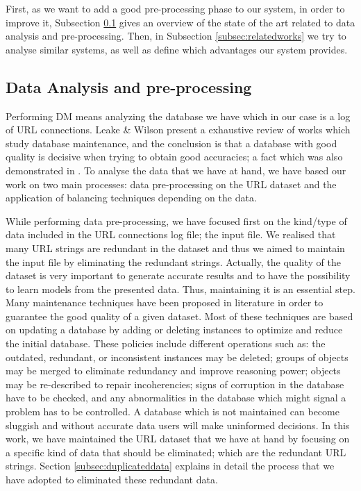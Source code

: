 \documentclass{llncs}
\begin{document}
First, as we want to add a good pre-processing phase to our system, in order to improve it, Subsection \ref{subsec:dataanalysis} gives an overview of the state of the art related to data analysis and pre-processing. Then, in Subsection \ref{subsec:relatedworks} we try to analyse similar systems, as well as define which advantages our system provides.

\subsection{Data Analysis and pre-processing}
\label{subsec:dataanalysis}

Performing DM means analyzing the database we have \cite{Frank2011}
which in our case is a log of URL connections. Leake \& Wilson
\cite{wilson2001maintaining} present a exhaustive review of works which
study database maintenance, and the conclusion is that a database with
good quality is decisive when trying to obtain good accuracies; a fact
which was also demonstrated in \cite{zeineb2014thesis}. To analyse the
data that we have at hand, we have based our work on two main
processes: data pre-processing on
the URL dataset and the application of balancing
techniques depending on the data. %

While performing data pre-processing, we have focused first on the
kind/type of data included in the URL connections log file; the input
file. We realised %
 that many URL strings are redundant in the dataset and thus we aimed
 to maintain the input file by eliminating the redundant
 strings. Actually, the quality of the dataset is very important to
 generate accurate results and to have the possibility to learn models
 from the presented data. Thus, maintaining it is an essential
 step. Many maintenance techniques have been proposed in literature \cite{wilson2001maintaining} in order to guarantee the good quality of a given dataset.   Most of these techniques are based on updating a database by adding or deleting instances to optimize and reduce the initial database. 
These policies include different operations such as: the outdated, redundant, or inconsistent instances may be deleted; groups of objects may be merged to eliminate redundancy and improve reasoning power; objects may be re-described to repair incoherencies; signs of corruption in the database have to be checked, and any abnormalities in the database which might signal a problem has to be controlled. A database which is not maintained can become sluggish and without accurate data users will make uninformed decisions. In this work, we have maintained the URL dataset that we have at hand by focusing on a specific kind of data that should be eliminated; which are the redundant URL strings. Section \ref{subsec:duplicateddata} explains in detail the process that we have adopted to eliminated these redundant data.
\end{document}
